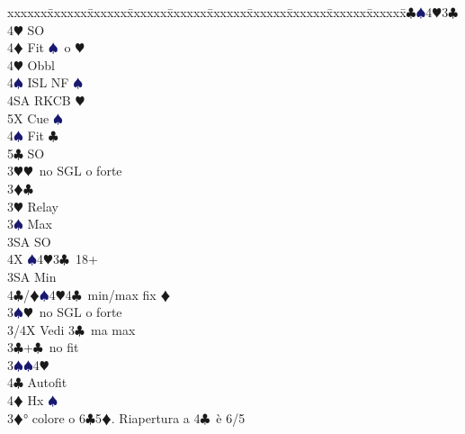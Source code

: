\documentclass[a4paper,italian]{article}
\newcommand{\BC}{\textcolor{OliveGreen}{$\clubsuit$}}
\newcommand{\BD}{\textcolor{RedOrange}{$\vardiamondsuit$}}
\newcommand{\BH}{\textcolor{Red2}{$\varheartsuit${}}}
\newcommand{\BS}{\textcolor{MidnightBlue}{$\spadesuit${}}}
\newenvironment{bidtable}
{\begin{tabbing}

    xxxxxx\=xxxxxx\=xxxxxx\=xxxxxx\=xxxxxx\=xxxxxx\=xxxxxx\=xxxxxx\=xxxxxx\=xxxxxx\=\kill}
{\end{tabbing} }%
\begin{document}
\begin{multicols}{2}
\begin{bidtable}
                                            4\BC {}\BS 4\BH 3\BC \+\\
                                            4\BH \> SO\\
                                            4\BD \> Fit \BS\ o \BH \+\\
                                            4\BH \> Obbl\+\\
                                            4\BS \> ISL NF \BS \\
                                            4SA \> RKCB \BH \\
                                            5X \> Cue \BS \-\-\\
                                            4\BS \> Fit \BC \\
                                            5\BC \> SO\-\-\\
                                            3\BH {}\BH\ no SGL o forte\-\\
                                            3\BD {}\BC \+\\
                                            3\BH \> Relay\+\\
                                            3\BS \> Max\+\\
                                            3SA \> SO\+\\
                                            4X \BS 4\BH 3\BC\ 18+\-\-\\
                                            3SA \> Min\\
                                            4\BC/\BD {}\BS 4\BH 4\BC\ min/max fix \BD \-\\
                                            3\BS {}\BH\ no SGL o forte\-\\
                                            3/4X \> Vedi 3\BC\ ma max\-\\
                                            3\BC {}+\BC\ no fit\+\\
                                            3\BS {}\BS 4\BH \+\\
                                            4\BC \> Autofit\\
                                            4\BD \> Hx \BS \-\-\\
                                            3\BD {}° colore o 6\BC 5\BD . Riapertura a 4\BC\ è 6/5\+\\

\end{bidtable}
\end{multicols}
\end{document}
